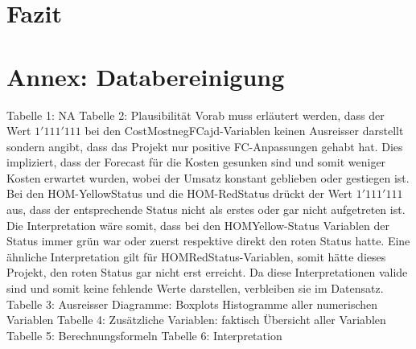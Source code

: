 
\section{Fazit}
\section*{Annex: Databereinigung}
Tabelle 1: NA
Tabelle 2: Plausibilität
Vorab muss erläutert werden, dass der Wert $1'111'111$ bei den CostMostnegFCajd-Variablen keinen Ausreisser darstellt sondern angibt, dass das Projekt nur positive FC-Anpassungen gehabt hat. Dies impliziert, dass der Forecast für die Kosten gesunken sind und somit weniger Kosten erwartet wurden, wobei der Umsatz konstant geblieben oder gestiegen ist. Bei den HOM-YellowStatus und die HOM-RedStatus drückt der Wert $1'111'111$ aus, dass der entsprechende Status nicht als erstes oder gar nicht aufgetreten ist. Die Interpretation wäre somit, dass bei den HOMYellow-Status Variablen der Status immer grün war oder zuerst respektive direkt den roten Status hatte. Eine ähnliche Interpretation gilt für HOMRedStatus-Variablen, somit hätte dieses Projekt, den roten Status gar nicht erst erreicht. Da diese Interpretationen valide sind und somit keine fehlende Werte darstellen, verbleiben sie im Datensatz. 
Tabelle 3: Ausreisser
Diagramme: Boxplots Histogramme aller numerischen Variablen
Tabelle 4: Zusätzliche Variablen: faktisch Übersicht aller Variablen 
Tabelle 5: Berechnungsformeln
Tabelle 6: Interpretation
